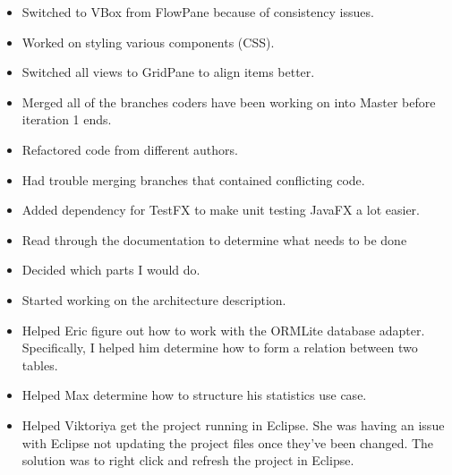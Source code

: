 \documentclass{article}
\begin{document}
	\begin{itemize}
    \item Switched to VBox from FlowPane because of consistency issues.
    \item Worked on styling various components (CSS).
	\end{itemize}
	\begin{itemize}
    \item Switched all views to GridPane to align items better.
	\end{itemize}
	\begin{itemize}
    \item Merged all of the branches coders have been working on into Master before iteration 1 ends.
    \item Refactored code from different authors.
    \item Had trouble merging branches that contained conflicting code.
    \item Added dependency for TestFX to make unit testing JavaFX a lot easier.
  \end{itemize}
  \begin{itemize}
    \item Read through the documentation to determine what needs to be done
    \item Decided which parts I would do.
  \end{itemize}
  \begin{itemize}
    \item Started working on the architecture description.
  \end{itemize}
  \begin{itemize}
    \item Helped Eric figure out how to work with the ORMLite database adapter. Specifically, I helped him determine
    how to form a relation between two tables.
  \end{itemize}
  \begin{itemize}
    \item Helped Max determine how to structure his statistics use case.
    \item Helped Viktoriya get the project running in Eclipse. She was having an issue with Eclipse not updating the
    project files once they've been changed. The solution was to right click and refresh the project in Eclipse.
  \end{itemize}
\end{document}
